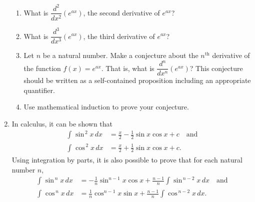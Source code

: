 \begin{enumerate}
\begin{enumerate}
\item What is  $\dfrac{{d^2 }}{{dx^2 }}\left( {e^{ax} } \right)$, the second derivative of   
$e^{ax} $?
	
\item What is  $\dfrac{{d^3 }}{{dx^3 }}\left( {e^{ax} } \right)$, the third derivative of   
$e^{ax} $?

\item Let  $n$  be a natural number.  Make a conjecture about the $n^{\text{th}}$ derivative of the function  $f\left( x \right) = e^{ax} $.  That is,  what is  
$\dfrac{{d^n }}{{dx^n }}\left( {e^{ax} } \right)$?  This conjecture should be written as a self-contained proposition including an appropriate quantifier.

\item Use mathematical induction to prove your conjecture.
\end{enumerate}


\item In calculus, it can be shown that
\label{exer:wallis}%
\begin{align*}
\int_{}^{} \sin^{\,2} x \, dx &= \frac{x}{2} - \frac{1}{2} \sin x \cos x + c \quad \text{and} \\
\int_{}{} \cos^{\,2} x \, dx &= \frac{x}{2} + \frac{1}{2} \sin x \cos x + c.
\end{align*}
Using integration by parts, it is also possible to prove that for each natural number $n$,
\begin{align*}
\int_{}{} \sin^{\,n} x \, dx &= -\frac{1}{n} \sin^{n-1}x \cos x + \frac{n-1}{n} 
\int{}{} \sin^{\,n-2}x \, dx \quad \text{and} \\
\int_{}{} \cos^{\,n} x \, dx &= \frac{1}{n} \cos^{n-1}x \sin x + \frac{n-1}{n} 
\int{}{} \cos^{\,n-2}x \, dx.
\end{align*}


\end{enumerate}
